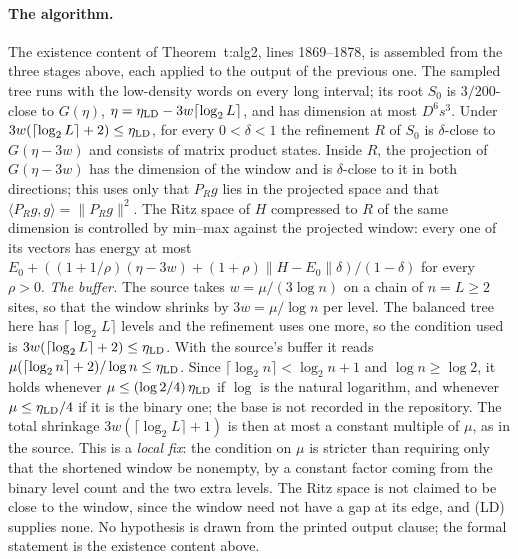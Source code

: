 \documentclass{article}
\begin{document}
\paragraph{The algorithm.}
The existence content of Theorem~t:alg2, lines 1869--1878, is assembled from
the three stages above, each applied to the output of the previous one. The
sampled tree runs with the low-density words on every long interval; its
root $S_0$ is $3/200$-close to $G(\eta)$, $\eta=\eta_{\rm LD}-3w\lceil\log_2
L\rceil$, and has dimension at most $D^6s^3$. Under
$3w(\lceil\log_2L\rceil+2)\le\eta_{\rm LD}$, for every $0<\delta<1$ the
refinement $R$ of $S_0$ is $\delta$-close to $G(\eta-3w)$ and consists of
matrix product states. Inside $R$, the projection of $G(\eta-3w)$ has the
dimension of the window and is $\delta$-close to it in both directions; this
uses only that $P_Rg$ lies in the projected space and that
$\langle P_Rg,g\rangle=\|P_Rg\|^2$. The Ritz space of $H$ compressed to $R$
of the same dimension is controlled by min--max against the projected
window: every one of its vectors has energy at most
$E_0+((1+1/\rho)(\eta-3w)+(1+\rho)\|H-E_0\|\delta)/(1-\delta)$ for every
$\rho>0$. \emph{The buffer.} The source takes $w=\mu/(3\log n)$ on a chain of $n=L\ge2$
sites, so that the window shrinks by $3w=\mu/\log n$ per level. The balanced
tree here has $\lceil\log_2L\rceil$ levels and the refinement uses one more,
so the condition used is $3w(\lceil\log_2L\rceil+2)\le\eta_{\rm LD}$. With the
source's buffer it reads $\mu(\lceil\log_2n\rceil+2)/\log n\le\eta_{\rm LD}$.
Since $\lceil\log_2n\rceil<\log_2n+1$ and $\log n\ge\log2$, it holds whenever
$\mu\le(\log2/4)\,\eta_{\rm LD}$ if $\log$ is the natural logarithm, and
whenever $\mu\le\eta_{\rm LD}/4$ if it is the binary one; the base is not
recorded in the repository. The total shrinkage $3w(\lceil\log_2L\rceil+1)$ is
then at most a constant multiple of $\mu$, as in the source. This is a
\emph{local fix}: the condition on $\mu$ is stricter than requiring only that
the shortened window be nonempty, by a constant factor coming from the binary
level count and the two extra levels.
The Ritz space is not claimed to be close to the window, since the
window need not have a gap at its edge, and (LD) supplies none. No
hypothesis is drawn from the printed output clause; the formal statement is
the existence content above.
\end{document}
